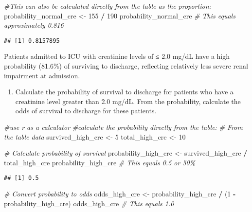 \documentclass[
]{article}
\newenvironment{Shaded}{\begin{snugshade}}{\end{snugshade}}
\newcommand{\CommentTok}[1]{\textcolor[rgb]{0.56,0.35,0.01}{\textit{#1}}}
\newcommand{\DecValTok}[1]{\textcolor[rgb]{0.00,0.00,0.81}{#1}}
\newcommand{\NormalTok}[1]{#1}
\newcommand{\OtherTok}[1]{\textcolor[rgb]{0.56,0.35,0.01}{#1}}
\newcommand{\SpecialCharTok}[1]{\textcolor[rgb]{0.81,0.36,0.00}{\textbf{#1}}}
\providecommand{\tightlist}{%
  \setlength{\itemsep}{0pt}\setlength{\parskip}{0pt}}
\begin{document}
\begin{Shaded}
\begin{Highlighting}[]
\CommentTok{\#This can also be calculated directly from the table as the proportion:}
\NormalTok{probability\_normal\_cre }\OtherTok{\textless{}{-}} \DecValTok{155} \SpecialCharTok{/} \DecValTok{190}
\NormalTok{probability\_normal\_cre  }\CommentTok{\# This equals approximately 0.816}
\end{Highlighting}
\end{Shaded}

\begin{verbatim}
## [1] 0.8157895
\end{verbatim}

Patients admitted to ICU with creatinine levels of ≤ 2.0 mg/dL have a
high probability (81.6\%) of surviving to discharge, reflecting
relatively less severe renal impairment at admission.

\begin{enumerate}
\def\labelenumi{\alph{enumi})}
\setcounter{enumi}{1}
\tightlist
\item
  Calculate the probability of survival to discharge for patients who
  have a creatinine level greater than 2.0 mg/dL. From the probability,
  calculate the odds of survival to discharge for these patients.
\end{enumerate}

\begin{Shaded}
\begin{Highlighting}[]
\CommentTok{\#use r as a calculator}
\CommentTok{\#calculate the probability directly from the table:}
\CommentTok{\# From the table data}
\NormalTok{survived\_high\_cre }\OtherTok{\textless{}{-}} \DecValTok{5}
\NormalTok{total\_high\_cre }\OtherTok{\textless{}{-}} \DecValTok{10}

\CommentTok{\# Calculate probability of survival}
\NormalTok{probability\_high\_cre }\OtherTok{\textless{}{-}}\NormalTok{ survived\_high\_cre }\SpecialCharTok{/}\NormalTok{ total\_high\_cre}
\NormalTok{probability\_high\_cre  }\CommentTok{\# This equals 0.5 or 50\%}
\end{Highlighting}
\end{Shaded}

\begin{verbatim}
## [1] 0.5
\end{verbatim}

\begin{Shaded}
\begin{Highlighting}[]
\CommentTok{\# Convert probability to odds}
\NormalTok{odds\_high\_cre }\OtherTok{\textless{}{-}}\NormalTok{ probability\_high\_cre }\SpecialCharTok{/}\NormalTok{ (}\DecValTok{1} \SpecialCharTok{{-}}\NormalTok{ probability\_high\_cre)}
\NormalTok{odds\_high\_cre  }\CommentTok{\# This equals 1.0}
\end{Highlighting}
\end{Shaded}
\end{document}

